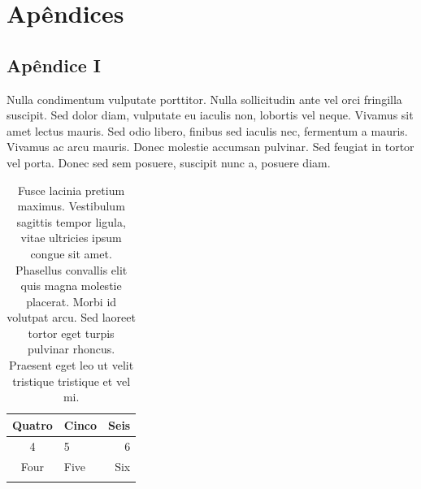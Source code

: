 \documentclass[book,A4paper,10pt,twoside,oldfontcommands]{memoir}\usepackage[]{graphicx}\usepackage[usenames,dvipsnames]{color}
\begin{document}


\chapter*{Apêndices}
\renewcommand{\thefigure}{A.\arabic{figure}}
\renewcommand{\thetable}{A.\arabic{table}}



\section*{Apêndice I}

Nulla condimentum vulputate porttitor. Nulla sollicitudin ante vel
orci fringilla suscipit. Sed dolor diam, vulputate eu iaculis non,
lobortis vel neque. Vivamus sit amet lectus mauris. Sed odio libero,
finibus sed iaculis nec, fermentum a mauris. Vivamus ac arcu mauris.
Donec molestie accumsan pulvinar. Sed feugiat in tortor vel porta.
Donec sed sem posuere, suscipit nunc a, posuere diam.

\begin{table}[h]
\centering
\caption{Fusce lacinia pretium maximus. Vestibulum sagittis tempor
  ligula, vitae ultricies ipsum congue sit amet. Phasellus convallis
  elit quis magna molestie placerat. Morbi id volutpat arcu. Sed
  laoreet tortor eget turpis pulvinar rhoncus. Praesent eget leo ut
  velit tristique tristique et vel mi.}
\begin{tabular}{clr} 
\hline
Quatro & Cinco & Seis\\
\hline
4 & 5 & 6 \\
Four & Five & Six\\
\hline
\label{Tab:A1}
\end{tabular}
\end{table}
\end{document}
